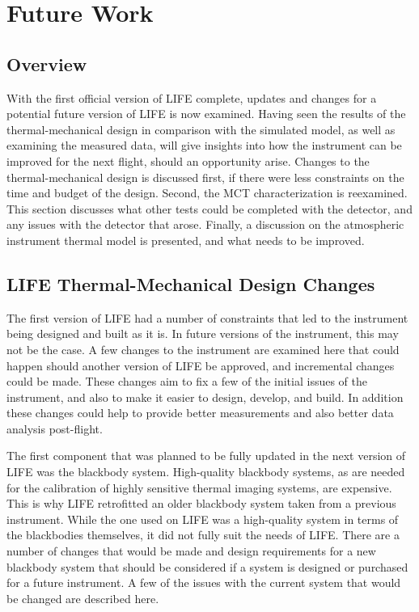 \chapter{Future Work} \label{future}

\section{Overview}
With the first official version of LIFE complete, updates and changes for a potential future version of LIFE is now examined. Having seen the results of the thermal-mechanical design in comparison with the simulated model, as well as examining the measured data, will give insights into how the instrument can be improved for the next flight, should an opportunity arise. Changes to the thermal-mechanical design is discussed first, if there were less constraints on the time and budget of the design. Second, the MCT characterization is reexamined. This section discusses what other tests could be completed with the detector, and any issues with the detector that arose. Finally, a discussion on the atmospheric instrument thermal model is presented, and what needs to be improved. 

\section{LIFE Thermal-Mechanical Design Changes}
The first version of LIFE had a number of constraints that led to the instrument being designed and built as it is. In future versions of the instrument, this may not be the case. A few changes to the instrument are examined here that could happen should another version of LIFE be approved, and incremental changes could be made. These changes aim to fix a few of the initial issues of the instrument, and also to make it easier to design, develop, and build. In addition these changes could help to provide better measurements and also better data analysis post-flight.

The first component that was planned to be fully updated in the next version of LIFE was the blackbody system. High-quality blackbody systems, as are needed for the calibration of highly sensitive thermal imaging systems, are expensive. This is why LIFE retrofitted an older blackbody system taken from a previous instrument. While the one used on LIFE was a high-quality system in terms of the blackbodies themselves, it did not fully suit the needs of LIFE. There are a number of changes that would be made and design requirements for a new blackbody system that should be considered if a system is designed or purchased for a future instrument. A few of the issues with the current system that would be changed are described here.

